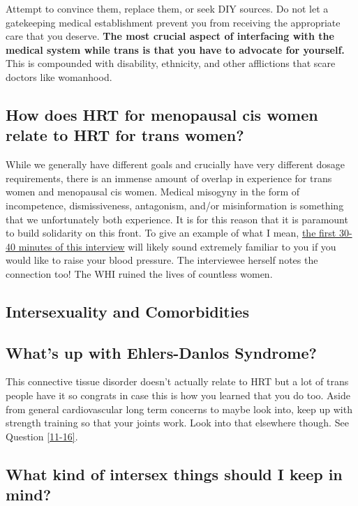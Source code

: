 \documentclass{article}
\begin{document}
Attempt to convince them, replace them, or seek DIY sources. Do not let a gatekeeping medical establishment prevent you from receiving the appropriate care that you deserve. \textbf{The most crucial aspect of interfacing with the medical system while trans is that you have to advocate for yourself.} This is compounded with disability, ethnicity, and other afflictions that scare doctors like womanhood.

\subsection{How does HRT for menopausal cis women relate to HRT for trans women?}\label{11-29}

While we generally have different goals and crucially have very different dosage requirements, there is an immense amount of overlap in experience for trans women and menopausal cis women. Medical misogyny in the form of incompetence, dismissiveness, antagonism, and/or misinformation is something that we unfortunately both experience. It is for this reason that it is paramount to build solidarity on this front. To give an example of what I mean, \href{https://www.youtube.com/watch?v=W0XW6av2wLQ}{the first 30-40 minutes of this interview} will likely sound extremely familiar to you if you would like to raise your blood pressure. The interviewee herself notes the connection too! The WHI ruined the lives of countless women.

\subsection*{Intersexuality and Comorbidities}

\subsection{What’s up with Ehlers-Danlos Syndrome?}

This connective tissue disorder doesn’t actually relate to HRT but a lot of trans people have it so congrats in case this is how you learned that you do too. Aside from general cardiovascular long term concerns to maybe look into, keep up with strength training so that your joints work. Look into that elsewhere though. See Question \ref{11-16}.

\subsection{What kind of intersex things should I keep in mind?}
\end{document}
